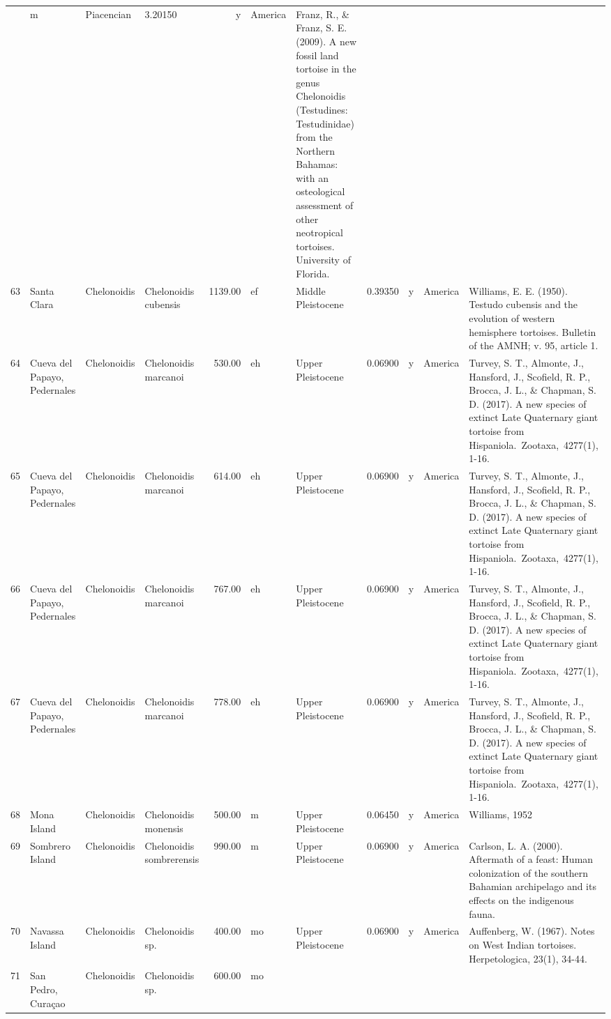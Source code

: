\documentclass[]{article}
\begin{document}
\begin{longtable}[]{@{}llllrllrlll@{}}
& m & Piacencian & 3.20150 & y & America & Franz, R., \& Franz, S. E.
(2009). A new fossil land tortoise in the genus Chelonoidis (Testudines:
Testudinidae) from the Northern Bahamas: with an osteological assessment
of other neotropical tortoises. University of Florida.\tabularnewline
63 & Santa Clara & Chelonoidis & Chelonoidis cubensis & 1139.00 & ef &
Middle Pleistocene & 0.39350 & y & America & Williams, E. E. (1950).
Testudo cubensis and the evolution of western hemisphere tortoises.
Bulletin of the AMNH; v. 95, article 1.\tabularnewline
64 & Cueva del Papayo, Pedernales & Chelonoidis & Chelonoidis marcanoi &
530.00 & eh & Upper Pleistocene & 0.06900 & y & America & Turvey, S. T.,
Almonte, J., Hansford, J., Scofield, R. P., Brocca, J. L., \& Chapman,
S. D. (2017). A new species of extinct Late Quaternary giant tortoise
from Hispaniola.~Zootaxa,~4277(1), 1-16.\tabularnewline
65 & Cueva del Papayo, Pedernales & Chelonoidis & Chelonoidis marcanoi &
614.00 & eh & Upper Pleistocene & 0.06900 & y & America & Turvey, S. T.,
Almonte, J., Hansford, J., Scofield, R. P., Brocca, J. L., \& Chapman,
S. D. (2017). A new species of extinct Late Quaternary giant tortoise
from Hispaniola.~Zootaxa,~4277(1), 1-16.\tabularnewline
66 & Cueva del Papayo, Pedernales & Chelonoidis & Chelonoidis marcanoi &
767.00 & eh & Upper Pleistocene & 0.06900 & y & America & Turvey, S. T.,
Almonte, J., Hansford, J., Scofield, R. P., Brocca, J. L., \& Chapman,
S. D. (2017). A new species of extinct Late Quaternary giant tortoise
from Hispaniola.~Zootaxa,~4277(1), 1-16.\tabularnewline
67 & Cueva del Papayo, Pedernales & Chelonoidis & Chelonoidis marcanoi &
778.00 & eh & Upper Pleistocene & 0.06900 & y & America & Turvey, S. T.,
Almonte, J., Hansford, J., Scofield, R. P., Brocca, J. L., \& Chapman,
S. D. (2017). A new species of extinct Late Quaternary giant tortoise
from Hispaniola.~Zootaxa,~4277(1), 1-16.\tabularnewline
68 & Mona Island & Chelonoidis & Chelonoidis monensis & 500.00 & m &
Upper Pleistocene & 0.06450 & y & America & Williams,
1952\tabularnewline
69 & Sombrero Island & Chelonoidis & Chelonoidis sombrerensis & 990.00 &
m & Upper Pleistocene & 0.06900 & y & America & Carlson, L. A. (2000).
Aftermath of a feast: Human colonization of the southern Bahamian
archipelago and its effects on the indigenous fauna.\tabularnewline
70 & Navassa Island & Chelonoidis & Chelonoidis sp. & 400.00 & mo &
Upper Pleistocene & 0.06900 & y & America & Auffenberg, W. (1967). Notes
on West Indian tortoises. Herpetologica, 23(1), 34-44.\tabularnewline
71 & San Pedro, Curaçao & Chelonoidis & Chelonoidis sp. & 600.00 & mo &

\end{longtable}
\end{document}
